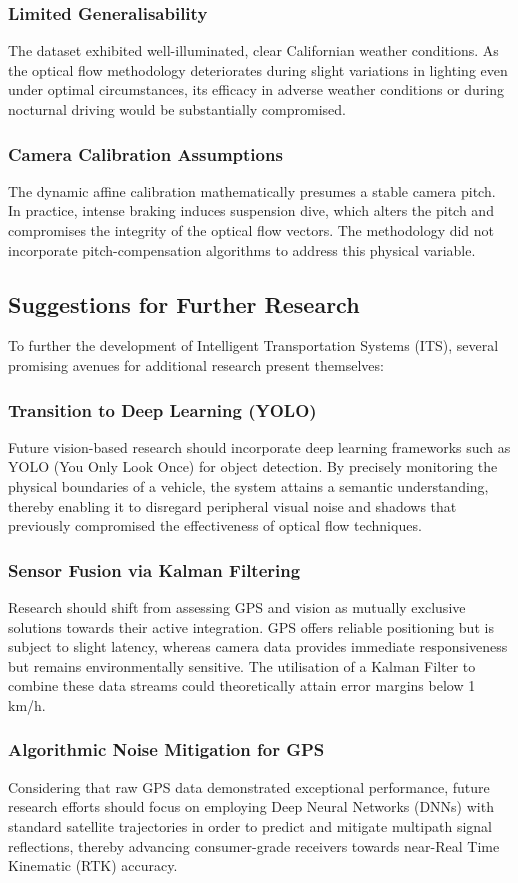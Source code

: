 \subsubsection{Limited Generalisability}
The dataset exhibited well-illuminated, clear Californian weather conditions. As the optical flow methodology deteriorates during slight variations in lighting even under optimal circumstances, its efficacy in adverse weather conditions or during nocturnal driving would be substantially compromised.

\subsubsection{Camera Calibration Assumptions}
The dynamic affine calibration mathematically presumes a stable camera pitch. In practice, intense braking induces suspension dive, which alters the pitch and compromises the integrity of the optical flow vectors. The methodology did not incorporate pitch-compensation algorithms to address this physical variable.

\subsection{Suggestions for Further Research}
To further the development of Intelligent Transportation Systems (ITS), several promising avenues for additional research present themselves:

\subsubsection{Transition to Deep Learning (YOLO)}
Future vision-based research should incorporate deep learning frameworks such as YOLO (You Only Look Once) for object detection. By precisely monitoring the physical boundaries of a vehicle, the system attains a semantic understanding, thereby enabling it to disregard peripheral visual noise and shadows that previously compromised the effectiveness of optical flow techniques.

\subsubsection{Sensor Fusion via Kalman Filtering}
Research should shift from assessing GPS and vision as mutually exclusive solutions towards their active integration. GPS offers reliable positioning but is subject to slight latency, whereas camera data provides immediate responsiveness but remains environmentally sensitive. The utilisation of a Kalman Filter to combine these data streams could theoretically attain error margins below 1 km/h.

\subsubsection{Algorithmic Noise Mitigation for GPS}
Considering that raw GPS data demonstrated exceptional performance, future research efforts should focus on employing Deep Neural Networks (DNNs) with standard satellite trajectories in order to predict and mitigate multipath signal reflections, thereby advancing consumer-grade receivers towards near-Real Time Kinematic (RTK) accuracy.